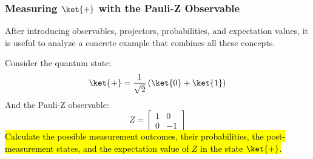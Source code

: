 \subsubsection{Measuring \texorpdfstring{$\ket{+}$}{|+>} with the Pauli-Z Observable}\label{sec:measuring-ket-with-the-pauli-z-observable}

After introducing observables, projectors, probabilities, and expectation values, it is useful to analyze a concrete example that combines all these concepts.

\highspace
Consider the quantum state:
\begin{equation*}
    \ket{+}
    =
    \frac{1}{\sqrt{2}}
    \left(
        \ket{0}
        +
        \ket{1}
    \right)
\end{equation*}
And the Pauli-Z observable:
\begin{equation*}
    Z
    =
    \begin{bmatrix}
        1 & 0 \\
        0 & -1
    \end{bmatrix}
\end{equation*}
\hl{Calculate the possible measurement outcomes, their probabilities, the post-measurement states, and the expectation value of $Z$ in the state $\ket{+}$.}


